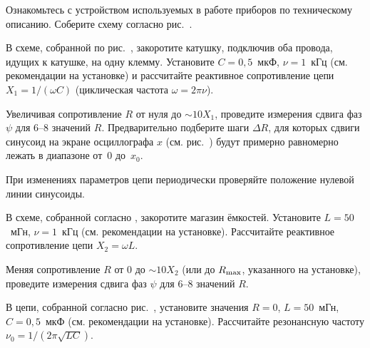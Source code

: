 \begin{lab:task}


\item Ознакомьтесь с устройством используемых в работе приборов по техническому
описанию. Соберите схему согласно рис.~.

\item В схеме, собранной по рис.~, закоротите катушку, подключив оба провода, 
идущих к катушке, на одну клемму. Установите $C=0,5$~мкФ, $\nu=1$~кГц 
(см. рекомендации на установке) и 
рассчитайте реактивное сопротивление цепи $X_1=1/(\omega C)$
(циклическая частота $\omega=2\pi\nu$).

\item Увеличивая сопротивление $R$ от нуля до $\sim 10 X_1$, проведите 
измерения сдвига фаз $\psi$ для 6--8 значений $R$.
Предварительно подберите шаги $\Delta R$, для которых 
сдвиги синусоид на экране осциллографа $x$ (см. рис.~) 
будут примерно равномерно лежать в диапазоне от~0 до~$x_0$. 

При изменениях параметров цепи периодически проверяйте положение 
нулевой линии синусоиды.


\item В схеме, собранной согласно , закоротите магазин ёмкостей. 
Установите $L=50$~мГн, $\nu=1$~кГц (см. рекомендации на установке). 
Рассчитайте реактивное сопротивление цепи $X_2=\omega L$.

\item Меняя сопротивление $R$ от 0 до $\sim 10X_2$ 
(или до $R_{\rm max}$, указанного на установке), 
проведите измерения сдвига фаз $\psi$ для 6--8 значений $R$.


\item В цепи, собранной согласно рис.~, установите значения 
$R=0$, $L=50$~мГн, $C=0,5$~мкФ (см. рекомендации на установке). 
Рассчитайте резонансную частоту $\nu_0=1/(2\pi\sqrt{LC})$.
 

\end{lab:task}
